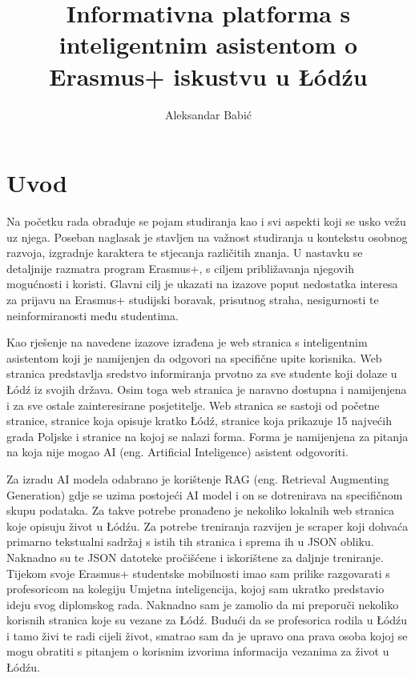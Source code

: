 \documentclass[]{foi}
\title{Informativna platforma s inteligentnim asistentom o Erasmus+ iskustvu u \L\'{o}d\'{z}u}
\author{Aleksandar Babić}
\begin{document}
\maketitle

\tableofcontents

\makeatletter {} \makeatother
\pagestyle{plain}



\chapter{Uvod}

Na početku rada obrađuje se pojam studiranja kao i svi aspekti koji se usko vežu uz njega. Poseban naglasak je stavljen na važnost studiranja u kontekstu osobnog razvoja, izgradnje karaktera
te stjecanja različitih znanja. U nastavku se detaljnije razmatra program Erasmus+, s ciljem približavanja njegovih mogućnosti i koristi. Glavni cilj je ukazati na izazove poput nedostatka interesa
za prijavu na Erasmus+ studijski boravak, prisutnog straha, nesigurnosti te neinformiranosti među studentima. 

Kao rješenje na navedene izazove izrađena je web stranica s inteligentnim asistentom koji je namijenjen da odgovori na specifične upite korisnika. Web stranica predstavlja sredstvo informiranja 
prvotno za sve studente koji dolaze u Łódź iz svojih država. Osim toga web stranica je naravno dostupna i namijenjena i za sve ostale zainteresirane posjetitelje. Web stranica se sastoji od 
početne stranice, stranice koja opisuje kratko Łódź, stranice koja prikazuje 15 najvećih grada Poljske i stranice na kojoj se nalazi forma. Forma je namijenjena za pitanja na koja nije mogao 
AI (eng. Artificial Inteligence) asistent odgovoriti. 

Za izradu AI modela odabrano je korištenje RAG (eng. Retrieval Augmenting Generation) gdje se uzima postojeći AI model i on se dotrenirava na specifičnom skupu podataka. 
Za takve potrebe pronađeno je nekoliko lokalnih web stranica koje opisuju život u Łódźu. Za potrebe treniranja razvijen je scraper koji dohvaća primarno tekstualni sadržaj s istih tih stranica
i sprema ih u JSON obliku. Naknadno su te JSON datoteke pročišćene i iskorištene za daljnje treniranje. Tijekom svoje Erasmus+ studentske mobilnosti imao sam prilike razgovarati s profesoricom na 
kolegiju Umjetna inteligencija, kojoj sam ukratko predstavio ideju svog diplomskog rada. Naknadno sam je zamolio da mi preporuči nekoliko korisnih stranica koje su vezane za Łódź. Budući da se profesorica rodila u Łódźu i tamo živi te radi cijeli život, smatrao sam da je upravo ona prava osoba kojoj se mogu obratiti
s pitanjem o korisnim izvorima informacija vezanima za život u Łódźu. 
\end{document}
